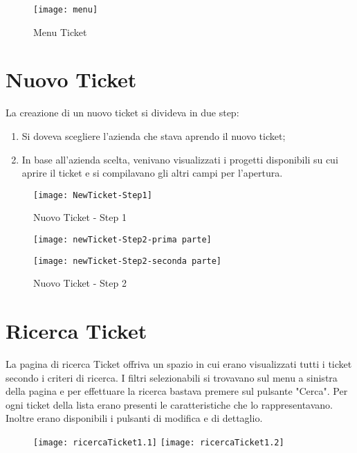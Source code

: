 \begin{figure}[H]
	\centering
    \texttt{[image: menu]} 
    \caption{Menu Ticket}
\end{figure}

\newpage

\section{Nuovo Ticket}
La creazione di un nuovo ticket si divideva in due step:
\begin{enumerate}
\item Si doveva scegliere l'azienda che stava aprendo il nuovo ticket;
\item In base all'azienda scelta, venivano visualizzati i progetti disponibili su cui aprire il ticket e si compilavano gli altri campi per l'apertura.
\end{enumerate}

 
\begin{figure}[H]
\bigskip
	\centering
    \texttt{[image: NewTicket-Step1]} 
    \caption{Nuovo Ticket - Step 1}
\end{figure}

\begin{figure}[H]
\bigskip
	\centering
	
    \texttt{[image: newTicket-Step2-prima parte]} 
\end{figure}

\begin{figure}[H]
\bigskip
	\centering

        \texttt{[image: newTicket-Step2-seconda parte]} 
    \caption{Nuovo Ticket - Step 2}
\end{figure}

\bigskip
\section{Ricerca Ticket}
La pagina di ricerca Ticket offriva un spazio in cui erano visualizzati tutti i ticket secondo i criteri di ricerca. I filtri selezionabili si trovavano sul menu a sinistra della pagina e per effettuare la ricerca bastava premere sul pulsante "Cerca". Per ogni ticket della lista erano presenti le caratteristiche che lo rappresentavano. Inoltre erano disponibili i pulsanti di modifica e di dettaglio.

\begin{figure}[H]
\bigskip
	\centering
    \texttt{[image: ricercaTicket1.1]} 
        \texttt{[image: ricercaTicket1.2]} 
\end{figure}

